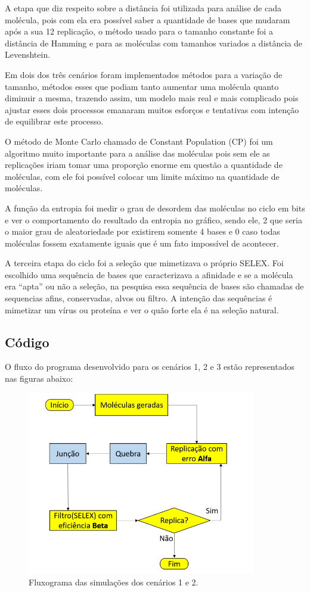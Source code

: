 A etapa que diz respeito sobre a distância foi utilizada para análise de cada
molécula, pois com ela era possível saber a quantidade de bases que mudaram após a sua 
12
replicação, o método usado para o tamanho constante foi a distância de Hamming e para
as moléculas com tamanhos variados a distância de Levenshtein.

Em dois dos três cenários foram implementados métodos para a variação de
tamanho, métodos esses que podiam tanto aumentar uma molécula quanto diminuir a
mesma, trazendo assim, um modelo mais real e mais complicado pois ajustar esses dois
processos emanaram muitos esforços e tentativas com intenção de equilibrar este
processo.

O método de Monte Carlo chamado de Constant Population (CP) foi um algoritmo
muito importante para a análise das moléculas pois sem ele as replicações iriam tomar
uma proporção enorme em questão a quantidade de moléculas, com ele foi possível
colocar um limite máximo na quantidade de moléculas.

A função da entropia foi medir o grau de desordem das moléculas no ciclo em bits
e ver o comportamento do resultado da entropia no gráfico, sendo ele, 2 que seria o maior
grau de aleatoriedade por existirem somente 4 bases e 0 caso todas moléculas fossem
exatamente iguais que é um fato impossível de acontecer.

A terceira etapa do ciclo foi a seleção que mimetizava o próprio SELEX. Foi
escolhido uma sequência de bases que caracterizava a afinidade e se a molécula era “apta”
ou não a seleção, na pesquisa essa sequência de bases são chamadas de sequencias afins,
conservadas, alvos ou filtro. A intenção das sequências é mimetizar um vírus ou proteína
e ver o quão forte ela é na seleção natural.


\subsection{Código}

O fluxo do programa desenvolvido para os cenários 1, 2 e 3 estão representados nas figuras abaixo:

\begin{figure}[!h]
    \centering
    \includegraphics[width=10cm]{figures/img-fluxo2.png}
    \caption{Fluxograma das simulações dos cenários 1 e 2.}
    \label{fig:fluxograma-cen1-cen2}
\end{figure}

